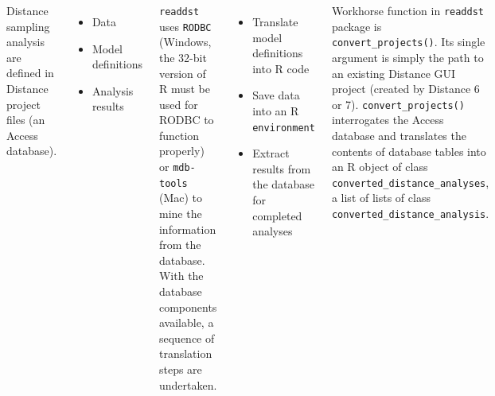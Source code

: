 \documentclass[14pt,a1paper,landscape]{tikzposter}
\begin{document}
\begin{columns}
{\begin{figure}
	\begin{tikzfigure}
		\includegraphics[width=.85\linewidth]{dst-file-structure.PNG}
	\end{tikzfigure}
\end{figure}

Distance sampling analysis are defined in Distance project files (an Access database).

\begin{itemize}
	\item Data
	\item Model definitions
	\item Analysis results
\end{itemize}

\texttt{readdst} uses \texttt{RODBC} (Windows, the 32-bit version of R must be used for RODBC to function properly) or \texttt{mdb-tools} (Mac) to mine the information from the database.  With the database components available, a sequence of translation steps are undertaken.

\begin{itemize}
	\item Translate model definitions into R code
	\item Save data into an R \texttt{environment}
	\item Extract results from the database for completed analyses
\end{itemize}

}

{
	Workhorse function in \texttt{readdst} package is \texttt{convert\_projects()}.  Its single argument is simply the path to an existing Distance GUI project (created by Distance 6 or 7).  \texttt{convert\_projects()} interrogates the Access database and translates the contents of database tables into an R object of class \texttt{converted\_distance\_analyses}, a list of lists of class \texttt{converted\_distance\_analysis}.
}
	

\end{columns}
\end{document}
